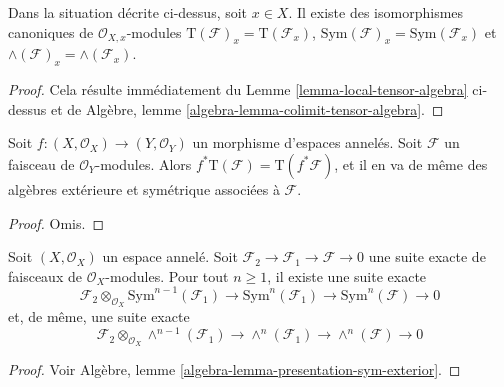 \begin{lemma}
\label{lemma-stalk-tensor-algebra}
Dans la situation décrite ci-dessus, soit $x \in X$.
Il existe des isomorphismes canoniques de $\mathcal{O}_{X, x}$-modules
$\text{T}(\mathcal{F})_x = \text{T}(\mathcal{F}_x)$,
$\text{Sym}(\mathcal{F})_x = \text{Sym}(\mathcal{F}_x)$ et
$\wedge(\mathcal{F})_x = \wedge(\mathcal{F}_x)$.
\end{lemma}

\begin{proof}
Cela résulte immédiatement du Lemme \ref{lemma-local-tensor-algebra} ci-dessus et de
Algèbre, lemme \ref{algebra-lemma-colimit-tensor-algebra}.
\end{proof}

\begin{lemma}
\label{lemma-pullback-tensor-algebra}
Soit $f : (X, \mathcal{O}_X) \to (Y, \mathcal{O}_Y)$ un morphisme
d'espaces annelés. Soit $\mathcal{F}$ un faisceau de $\mathcal{O}_Y$-modules.
Alors $f^*\text{T}(\mathcal{F}) = \text{T}(f^*\mathcal{F})$,
et il en va de même des algèbres extérieure et symétrique associées
à $\mathcal{F}$.
\end{lemma}

\begin{proof}
Omis.
\end{proof}

\begin{lemma}
\label{lemma-presentation-sym-exterior}
Soit $(X, \mathcal{O}_X)$ un espace annelé.
Soit $\mathcal{F}_2 \to \mathcal{F}_1 \to \mathcal{F} \to 0$
une suite exacte de faisceaux de $\mathcal{O}_X$-modules.
Pour tout $n \geq 1$, il existe une suite exacte
$$
\mathcal{F}_2 \otimes_{\mathcal{O}_X} \text{Sym}^{n - 1}(\mathcal{F}_1)
\to
\text{Sym}^n(\mathcal{F}_1)
\to
\text{Sym}^n(\mathcal{F})
\to
0
$$
et, de même, une suite exacte
$$
\mathcal{F}_2 \otimes_{\mathcal{O}_X} \wedge^{n - 1}(\mathcal{F}_1)
\to
\wedge^n(\mathcal{F}_1)
\to
\wedge^n(\mathcal{F})
\to
0
$$
\end{lemma}

\begin{proof}
Voir Algèbre, lemme \ref{algebra-lemma-presentation-sym-exterior}.
\end{proof}

